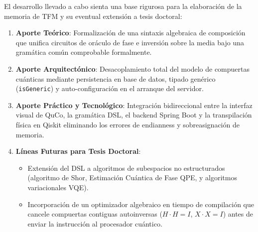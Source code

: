 \documentclass[11pt,a4paper]{article}
\begin{document}
El desarrollo llevado a cabo sienta una base rigurosa para la elaboración de la memoria de TFM y su eventual extensión a tesis doctoral:
\begin{enumerate}
    \item \textbf{Aporte Teórico}: Formalización de una sintaxis algebraica de composición que unifica circuitos de oráculo de fase e inversión sobre la media bajo una gramática común comprobable formalmente.
    \item \textbf{Aporte Arquitectónico}: Desacoplamiento total del modelo de compuertas cuánticas mediante persistencia en base de datos, tipado genérico (\texttt{isGeneric}) y auto-configuración en el arranque del servidor.
    \item \textbf{Aporte Práctico y Tecnológico}: Integración bidireccional entre la interfaz visual de QuCo, la gramática DSL, el backend Spring Boot y la transpilación física en Qiskit eliminando los errores de endianness y sobreasignación de memoria.
    \item \textbf{Líneas Futuras para Tesis Doctoral}:
    \begin{itemize}
        \item Extensión del DSL a algoritmos de subespacios no estructurados (algoritmo de Shor, Estimación Cuántica de Fase QPE, y algoritmos variacionales VQE).
        \item Incorporación de un optimizador algebraico en tiempo de compilación que cancele compuertas contiguas autoinversas ($H \cdot H = I$, $X \cdot X = I$) antes de enviar la instrucción al procesador cuántico.
    \end{itemize}
\end{enumerate}
\end{document}
